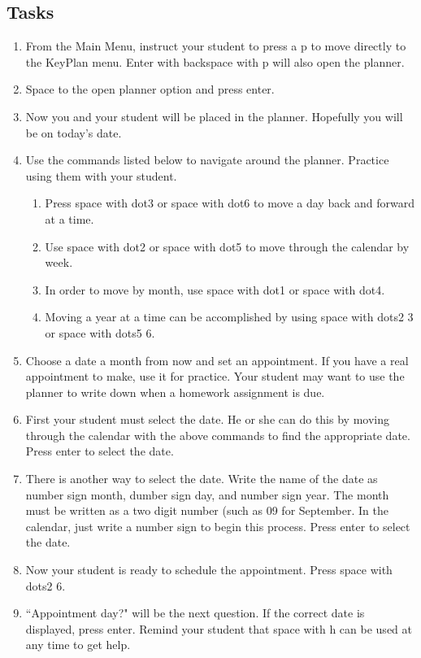 \documentclass[10pt,letterpaper,twoside]{report}
\begin{document}
{{{\subsection{Tasks}
\begin{enumerate}
	\item From the Main Menu, instruct your student to press a p to move directly to the KeyPlan menu.  Enter with backspace with p will also open the planner.
	\item Space to the open planner option and press enter.
	\item Now you and your student will be placed in the planner.  Hopefully you will be on today's date.
	\item Use the commands listed below to navigate around the planner.  Practice using them with your student.
	      \begin{enumerate}
		      \item Press space with dot3 or space with dot6 to move a day back and forward at a time.
		      \item Use space with dot2 or space with dot5 to move through the calendar by week.
		      \item In order to move by month, use space with dot1 or space with dot4.
		      \item Moving a year at a time can be accomplished by using space with dots2 3 or space with dots5 6.
	      \end{enumerate}
	\item Choose a date a month from now and set an appointment.  If you have a real appointment to make, use it for practice.  Your student may want to use the planner to write down when a homework assignment is due.
	\item First your student must select the date.  He or she can do this by moving through the calendar with the above commands to find the appropriate date. Press enter to select the date.
	\item There is another way to select the date.  Write the name of the date as number sign month, dumber sign day, and number sign year.  The month must be written as a two digit number (such as 09 for September.  In the calendar, just write a number sign to begin this process.  Press enter to select the date.
	\item Now your student is ready to schedule the appointment.  Press space with dots2 6.
	\item ``Appointment day?" will be the next question.  If the correct date is displayed, press enter.  Remind your student that space with h can be used at any time to get help.

\end{enumerate}}}}
\end{document}
